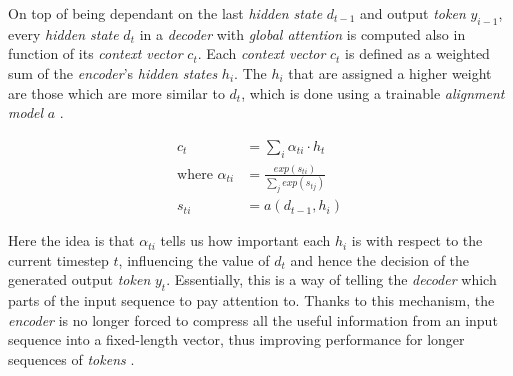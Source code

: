 On top of being dependant on the last \textit{hidden state} $d_{t-1}$ and output \textit{token} $y_{i-1}$, every \textit{hidden state} $d_t$ in a \textit{decoder} with \textit{global attention} is computed also in function of its \textit{context vector} $c_t$. Each \textit{context vector} $c_t$ is defined as a weighted sum of the \textit{encoder}'s \textit{hidden states} $h_i$. The $h_i$ that are assigned a higher weight are those which are more similar to $d_t$, which is done using a trainable \textit{alignment model} $a$ \cite{bahdanau_neural_2016}.

\begin{equation}
\begin{aligned}
c_t &= \sum_{i} \alpha_{ti} \cdot h_t \\
\mbox{where } \alpha_{ti} &= \frac{exp(s_{ti})}{\sum_{j} exp(s_{tj})} \\
s_{ti} &= a(d_{t-1},h_i)
\end{aligned}
\end{equation}

\noindent
Here the idea is that $\alpha_{ti}$ tells us how important each $h_i$ is with respect to the current timestep $t$, influencing the value of $d_t$ and hence the decision of the generated output \textit{token} $y_t$. Essentially, this is a way of telling the \textit{decoder} which parts of the input sequence to pay attention to. Thanks to this mechanism, the \textit{encoder} is no longer forced to compress all the useful information from an input sequence into a fixed-length vector, thus improving performance for longer sequences of \textit{tokens} \cite{bahdanau_neural_2016}.